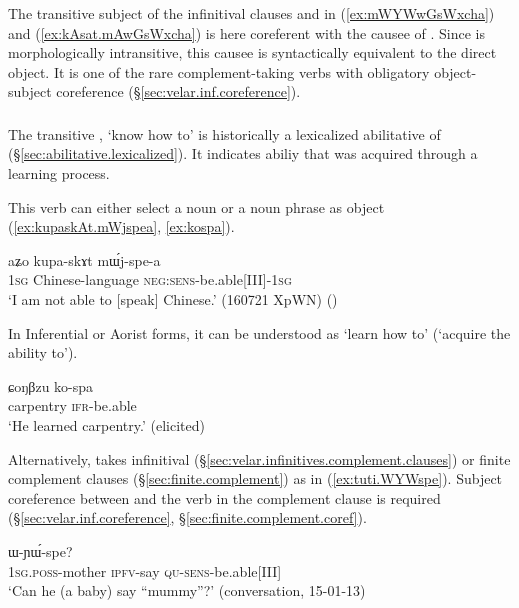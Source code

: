 The transitive subject of the infinitival clauses  and  in (\ref{ex:mWYWwGsWxcha}) and (\ref{ex:kAsat.mAwGsWxcha}) is here coreferent with the causee of . Since  is morphologically intransitive, this causee is syntactically equivalent to the direct object. It is one of the rare complement-taking verbs with obligatory object-subject coreference (§\ref{sec:velar.inf.coreference}).

 \subsubsection{}  \label{sec:spa.verb}
The transitive , `know how to' is historically a lexicalized abilitative of  (§\ref{sec:abilitative.lexicalized}). It indicates abiliy that was acquired through a learning process.

This verb can either select a noun or a noun phrase as object (\ref{ex:kupaskAt.mWjspea}, \ref{ex:kospa}). 


\begin{exe}
\ex \label{ex:kupaskAt.mWjspea}
\gll aʑo kupa-skɤt mɯ́j-spe-a \\
\textsc{1sg} Chinese-language \textsc{neg}:\textsc{sens}-be.able[III]-\textsc{1sg} \\
\glt `I am not able to [speak] Chinese.' (160721 XpWN)
()
\end{exe}

In Inferential or Aorist forms, it can be understood as `learn how to' (`acquire the ability to').

\begin{exe}
\ex \label{ex:kospa}
\gll ɕoŋβzu ko-spa \\
carpentry \textsc{ifr}-be.able \\
\glt `He learned carpentry.' (elicited)
\end{exe}

Alternatively,  takes infinitival (§\ref{sec:velar.infinitives.complement.clauses}) or finite complement clauses (§\ref{sec:finite.complement}) as in (\ref{ex:tuti.WYWspe}). Subject coreference between  and the verb in the complement clause is required  (§\ref{sec:velar.inf.coreference},  §\ref{sec:finite.complement.coref}).

\begin{exe}
\ex \label{ex:tuti.WYWspe}
 \gll [``a-mu" tu-ti] ɯ-ɲɯ́-spe? \\
 \textsc{1sg}.\textsc{poss}-mother \textsc{ipfv}-say \textsc{qu}-\textsc{sens}-be.able[III] \\
 \glt `Can he (a baby) say ``mummy''?' (conversation, 15-01-13)
  \end{exe}
  
